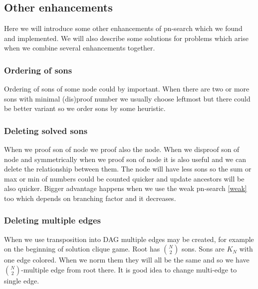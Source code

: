 \chapter{}


\section{Other enhancements}
Here we will introduce some other enhancements of pn-search which we found and
implemented. We will also describe some solutions for problems which arise 
when we combine several enhancements together. 

\subsection{Ordering of sons} \label{ord}

Ordering of sons of some node could by important. When there are two or more
sons with minimal (dis)proof number we usually choose leftmost but there could
be better variant so we order sons by some heuristic.

\subsection{Deleting solved sons}

When we proof son of  node we proof also the node. When we disproof
son of  node and symmetrically when we proof son of  node it
is also useful and we can delete the relationship between them. The node will
have less sons so the sum or max or min of numbers could be counted quicker and
update ancestors will be also quicker. Bigger advantage happens when we use the
weak pn-search \ref{weak}\TODO{<-} too which depends on branching factor and it decreases.

\subsection{Deleting multiple edges }

When we use transposition into DAG multiple edges may be created, for example
on the beginning of solution clique game. Root has $N \choose 2$ sons. Sons are
$K_N$ with one edge colored. When we norm them they will all be the same and so
we have $N \choose 2$-multiple edge from root there. It is good idea to
change multi-edge to single edge.

